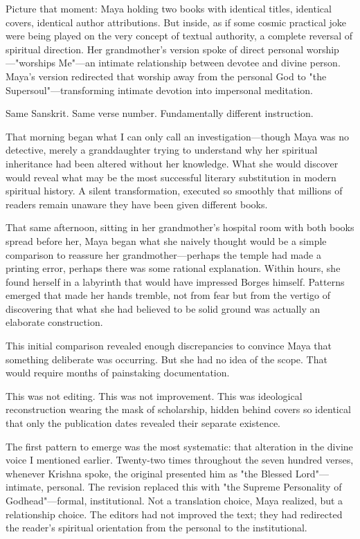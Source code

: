 \documentclass[12pt,twoside]{book}
\begin{document}
Picture that moment: Maya holding two books with identical titles, identical covers, identical author attributions. But inside, as if some cosmic practical joke were being played on the very concept of textual authority, a complete reversal of spiritual direction. Her grandmother's version spoke of direct personal worship—"worships Me"—an intimate relationship between devotee and divine person. Maya's version redirected that worship away from the personal God to "the Supersoul"—transforming intimate devotion into impersonal meditation.

Same Sanskrit. Same verse number. Fundamentally different instruction.

That morning began what I can only call an investigation—though Maya was no detective, merely a granddaughter trying to understand why her spiritual inheritance had been altered without her knowledge. What she would discover would reveal what may be the most successful literary substitution in modern spiritual history. A silent transformation, executed so smoothly that millions of readers remain unaware they have been given different books.

That same afternoon, sitting in her grandmother's hospital room with both books spread before her, Maya began what she naively thought would be a simple comparison to reassure her grandmother—perhaps the temple had made a printing error, perhaps there was some rational explanation. Within hours, she found herself in a labyrinth that would have impressed Borges himself. Patterns emerged that made her hands tremble, not from fear but from the vertigo of discovering that what she had believed to be solid ground was actually an elaborate construction.

This initial comparison revealed enough discrepancies to convince Maya that something deliberate was occurring. But she had no idea of the scope. That would require months of painstaking documentation.

This was not editing. This was not improvement. This was ideological reconstruction wearing the mask of scholarship, hidden behind covers so identical that only the publication dates revealed their separate existence.

The first pattern to emerge was the most systematic: that alteration in the divine voice I mentioned earlier. Twenty-two times throughout the seven hundred verses, whenever Krishna spoke, the original presented him as "the Blessed Lord"—intimate, personal. The revision replaced this with "the Supreme Personality of Godhead"—formal, institutional. Not a translation choice, Maya realized, but a relationship choice. The editors had not improved the text; they had redirected the reader's spiritual orientation from the personal to the institutional.
\end{document}
